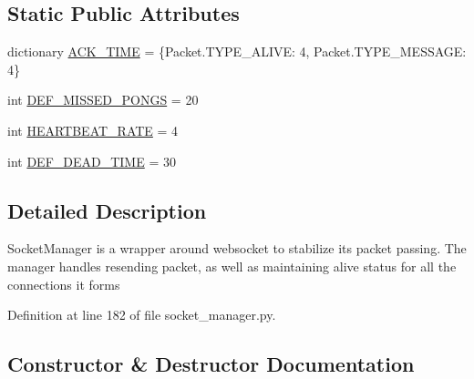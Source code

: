 \subsection*{Static Public Attributes}
\begin{DoxyCompactItemize}
\item 
dictionary \hyperlink{classparlai_1_1mturk_1_1core_1_1legacy__2018_1_1socket__manager_1_1SocketManager_ad736ebbf4b90b971990315a51a05f989}{A\+C\+K\+\_\+\+T\+I\+ME} = \{Packet.\+T\+Y\+P\+E\+\_\+\+A\+L\+I\+V\+E\+: 4, Packet.\+T\+Y\+P\+E\+\_\+\+M\+E\+S\+S\+A\+G\+E\+: 4\}
\item 
int \hyperlink{classparlai_1_1mturk_1_1core_1_1legacy__2018_1_1socket__manager_1_1SocketManager_a2e9b796f2fbd927a81161cc7cb013d7e}{D\+E\+F\+\_\+\+M\+I\+S\+S\+E\+D\+\_\+\+P\+O\+N\+GS} = 20
\item 
int \hyperlink{classparlai_1_1mturk_1_1core_1_1legacy__2018_1_1socket__manager_1_1SocketManager_af074c033355e16c086a83ce45ca47a7a}{H\+E\+A\+R\+T\+B\+E\+A\+T\+\_\+\+R\+A\+TE} = 4
\item 
int \hyperlink{classparlai_1_1mturk_1_1core_1_1legacy__2018_1_1socket__manager_1_1SocketManager_a23579f0600d24fab215afdb41ad317a1}{D\+E\+F\+\_\+\+D\+E\+A\+D\+\_\+\+T\+I\+ME} = 30
\end{DoxyCompactItemize}


\subsection{Detailed Description}
\begin{DoxyVerb}SocketManager is a wrapper around websocket to stabilize its packet
passing. The manager handles resending packet, as well as maintaining
alive status for all the connections it forms
\end{DoxyVerb}
 

Definition at line 182 of file socket\+\_\+manager.\+py.



\subsection{Constructor \& Destructor Documentation}
\mbox{\label{classparlai_1_1mturk_1_1core_1_1legacy__2018_1_1socket__manager_1_1SocketManager_ac4a8060782edd077f684e1f90a04f75d}} 
